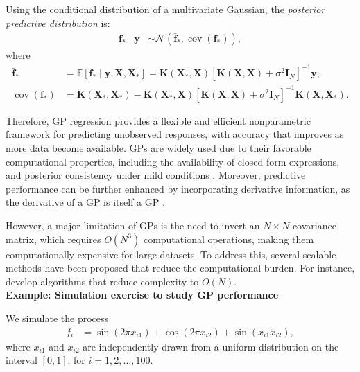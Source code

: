 Using the conditional distribution of a multivariate Gaussian, the \textit{posterior predictive distribution} \cite{rasmussen2006gaussian} is:
\begin{align*}
	\mathbf{f}_* \mid \mathbf{y} &\sim \mathcal{N}(\bar{\mathbf{f}}_*, \operatorname{cov}(\mathbf{f}_*)),
\end{align*}
where
\begin{align*}
	\bar{\mathbf{f}}_* &= \mathbb{E}[\mathbf{f}_* \mid \mathbf{y}, \mathbf{X}, \mathbf{X}_*] = \mathbf{K}(\mathbf{X}_*, \mathbf{X}) [\mathbf{K}(\mathbf{X}, \mathbf{X}) + \sigma^2 \mathbf{I}_N]^{-1} \mathbf{y}, \\
	\operatorname{cov}(\mathbf{f}_*) &= \mathbf{K}(\mathbf{X}_*, \mathbf{X}_*) - \mathbf{K}(\mathbf{X}_*, \mathbf{X}) [\mathbf{K}(\mathbf{X}, \mathbf{X}) + \sigma^2 \mathbf{I}_N]^{-1} \mathbf{K}(\mathbf{X}, \mathbf{X}_*).
\end{align*}

Therefore, GP regression provides a flexible and efficient nonparametric framework for predicting unobserved responses, with accuracy that improves as more data become available. GPs are widely used due to their favorable computational properties, including the availability of closed-form expressions, and posterior consistency under mild conditions \cite{choi2007posterior, stuart2018posterior}. Moreover, predictive performance can be further enhanced by incorporating derivative information, as the derivative of a GP is itself a GP \cite{solak2003derivative,jacobi2024posterior}. 

However, a major limitation of GPs is the need to invert an \( N \times N \) covariance matrix, which requires \( O(N^3) \) computational operations, making them computationally expensive for large datasets. To address this, several scalable methods have been proposed that reduce the computational burden. For instance, \cite{wilson2015kernel,gardner2018product, pleiss2018constant} develop algorithms that reduce complexity to \( O(N) \).\\

\textbf{Example: Simulation exercise to study GP performance}

We simulate the process
\begin{align*}
	f_i & = \sin(2\pi x_{i1}) + \cos(2\pi x_{i2}) + \sin(x_{i1} x_{i2}),
\end{align*}
where $x_{i1}$ and $x_{i2}$ are independently drawn from a uniform distribution on the interval $[0, 1]$, for $i = 1, 2, \dots, 100$.

